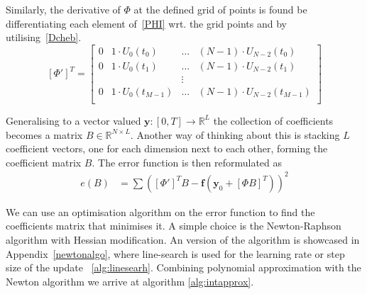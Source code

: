 \documentclass{article}
\begin{document}
    Similarly, the derivative of $\Phi$ at the defined grid of points is found be differentiating each element of~\eqref{PHI} wrt.
    the grid points and by utilising~\eqref{Dcheb}.
    \begin{equation}
        \label{PHI}
        \left[ \Phi' \right]^T =
        \begin{bmatrix}
            0 & 1 \cdot U_0(t_0)     & \dots & (N-1) \cdot U_{N-2}(t_{0})   \\
            0 & 1 \cdot U_0(t_1)     & \dots & (N-1) \cdot U_{N-2}(t_1)     \\
            & & \vdots \\
            0 & 1 \cdot U_0(t_{M-1}) & \dots & (N-1) \cdot U_{N-2}(t_{M-1}) \\
        \end{bmatrix}
    \end{equation}

    Generalising to a vector valued $\pmb{y} : [0,T] \to \mathbb{R}^L$ the collection of coefficients becomes a matrix $B\in \mathbb{R}^{N \times L}$.
    Another way of thinking about this is stacking $L$ coefficient vectors, one for each dimension next to each other, forming the coefficient matrix $B$.
    The error function is then reformulated as
    \begin{align}
        e(B) &= \sum \left(
        \left[ \Phi' \right]^T B -
        \pmb{f} \left( \pmb{y}_0 + \left[ \Phi B \right]^T \right)
        \right)^2
        \label{approx_error}
    \end{align}

    \begin{figure}[h]
        \begin{center}
            
        \end{center}
        \label{fig:reg_sol}
    \end{figure}

    We can use an optimisation algorithm on the error function to find the coefficients matrix that minimises it.
    A simple choice is the Newton-Raphson algorithm with Hessian modification.
    An version of the algorithm is showcased in Appendix~\ref{newtonalgo}, where line-search is used for the learning
    rate or step size of the update ~\ref{alg:linesearh}.
    Combining polynomial approximation with the Newton algorithm we arrive at algorithm \ref{alg:intapprox}.
\end{document}
